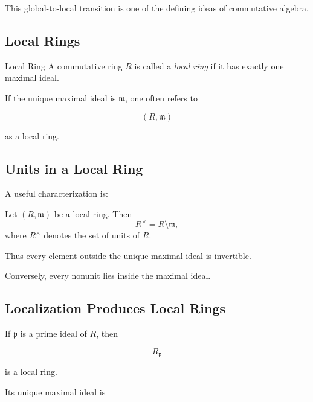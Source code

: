 This global-to-local transition is one of the defining ideas of commutative
algebra.

\subsection{Local Rings}
\label{subsec:local-rings}

\begin{definitionbox}{Local Ring}
A commutative ring \(R\) is called a \emph{local ring} if it has exactly one
maximal ideal.
\end{definitionbox}

If the unique maximal ideal is \(\mathfrak m\), one often refers to

\[ (R,\mathfrak m) \]

as a local ring.

\subsection{Units in a Local Ring}
\label{subsec:units-local-ring}

A useful characterization is:

\begin{theorem}
Let \((R,\mathfrak m)\) be a local ring. Then
\[ R^\times=R\setminus\mathfrak m, \]
where \(R^\times\) denotes the set of units of \(R\).
\end{theorem}

Thus every element outside the unique maximal ideal is invertible.

Conversely, every nonunit lies inside the maximal ideal.

\subsection{Localization Produces Local Rings}
\label{subsec:localization-produces-local-rings}

If \(\mathfrak p\) is a prime ideal of \(R\), then

\[ R_{\mathfrak p} \]

is a local ring.

Its unique maximal ideal is


